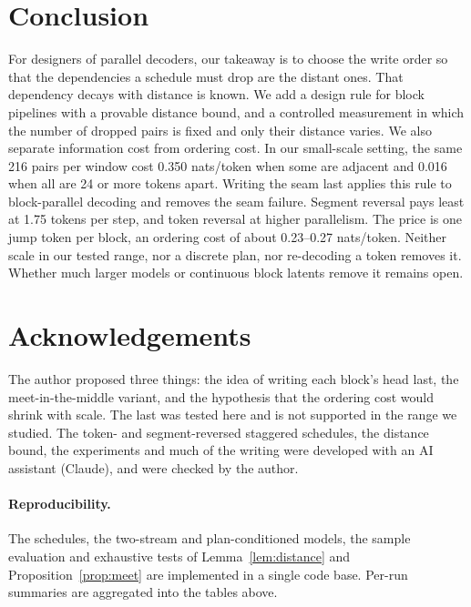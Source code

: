 \documentclass[11pt]{article}
\theoremstyle{definition}
\theoremstyle{remark}
\begin{document}
\section{Conclusion}

For designers of parallel decoders, our takeaway is to choose the write order so that the dependencies a schedule must drop are the distant ones.
That dependency decays with distance is known.
We add a design rule for block pipelines with a provable distance bound, and a controlled measurement in which the number of dropped pairs is fixed and only their distance varies.
We also separate information cost from ordering cost.
In our small-scale setting, the same 216 pairs per window cost 0.350 nats/token when some are adjacent and 0.016 when all are 24 or more tokens apart.
Writing the seam last applies this rule to block-parallel decoding and removes the seam failure.
Segment reversal pays least at 1.75 tokens per step, and token reversal at higher parallelism.
The price is one jump token per block, an ordering cost of about 0.23--0.27 nats/token.
Neither scale in our tested range, nor a discrete plan, nor re-decoding a token removes it.
Whether much larger models or continuous block latents remove it remains open.

\section*{Acknowledgements}
The author proposed three things: the idea of writing each block's head last, the meet-in-the-middle variant, and the hypothesis that the ordering cost would shrink with scale. The last was tested here and is not supported in the range we studied.
The token- and segment-reversed staggered schedules, the distance bound, the experiments and much of the writing were developed with an AI assistant (Claude), and were checked by the author.

\paragraph{Reproducibility.}
The schedules, the two-stream and plan-conditioned models, the sample evaluation and exhaustive tests of Lemma~\ref{lem:distance} and Proposition~\ref{prop:meet} are implemented in a single code base.
Per-run summaries are aggregated into the tables above.
\end{document}
